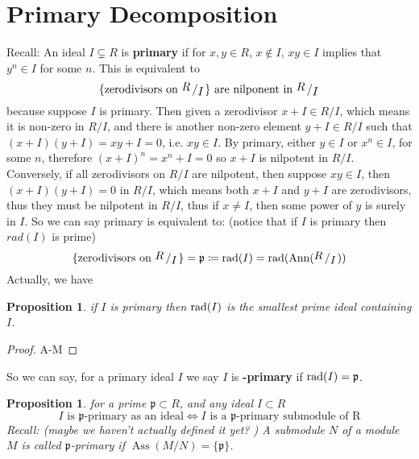 \documentclass[12pt]{article}
\newcommand{\rad}{\textup{rad}}
\newcommand{\ann}[1]{\textup{Ann}(#1)}
\DeclareMathOperator{\Ass}{Ass}
\newcommand{\bigslant}[2]{{\raisebox{.2em}{$#1$}\left/\raisebox{-.2em}{$#2$}\right.}}
\def\p{\mathfrak{p}}
\newtheorem{prop}[theorem]{Proposition}
\theoremstyle{definition}
\begin{document}
\section*{Primary Decomposition}
Recall: An ideal $I \subsetneq R$ is \textbf{primary} if for $x,y\in R$, $x\notin I$, $xy\in I$ implies that $y^n\in I$ for some $n$. This is equivalent to 
\[
\{\text{zerodivisors on } \bigslant{R}{I}\} \text{ are nilponent in }\bigslant{R}{I}
\]
because suppose $I$ is primary. Then given a zerodivisor $x+I \in R/I$, which means it is non-zero in $R/I$, and there is another non-zero element $y+I \in R/I$ such that $(x+I)(y+I) = xy+I =0$, i.e. $xy\in I$. By primary, either $y\in I$ or $x^n \in I$, for some $n$, therefore $(x+I)^n = x^n+I = 0$ so $x+I$ is nilpotent in $R/I$. Conversely, if all zerodivisors on $R/I$ are nilpotent, then suppose $xy \in I$, then $(x+I)(y+I) = 0$ in $R/I$, which means both $x+I$ and $y+I$ are zerodivisors, thus they must be nilpotent in $R/I$, thus if $x\neq I$, then some power of $y$ is surely in $I$. So we can say primary is equivalent to: (notice that if $I$ is primary then $rad(I)$ is prime)
\[
\{\text{zerodivisors on } \bigslant{R}{I}\} = \p\coloneqq \rad(I) = \rad(\ann{\bigslant{R}{I}})
\]
Actually, we have
\begin{prop}
if $I$ is primary then $\rad(I)$ is the smallest prime ideal containing $I$.
\end{prop}
\begin{proof}
A-M
\end{proof}
So we can say, for a primary ideal $I$ we say $I$ is \textbf{\boldsymbol{\p}-primary} if $\rad(I) = \p$.\\
\begin{prop}
for a prime $\p \subset R$, and any ideal $I\subset R$ 
\[
I \text{ is $\p$-primary as an ideal} \iff I\text{ is a $\p$-primary submodule of R}
\]
Recall: (maybe we haven't actually defined it yet? ) A submodule $N$ of a module $M$ is called $\p$-primary if $\Ass(M/N) = \{\p\}$.
\end{prop}
\end{document}
